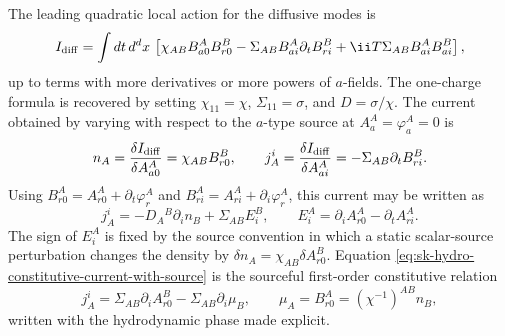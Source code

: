 The leading quadratic local action for the diffusive modes is
\begin{equation}
  I_{\rm diff}
  =
  \int dt\,d^dx\,
  \left[
  \chi_{AB}B^A_{a0}B^B_{r0}
  -\Sigma_{AB}B^A_{ai}\partial_t B^B_{ri}
  +\ii T\Sigma_{AB}B^A_{ai}B^B_{ai}
  \right],
  \label{eq:sk-hydro-diffusion-action}
\end{equation}
up to terms with more derivatives or more powers of \(a\)-fields.  The
one-charge formula is recovered by setting
\(\chi_{11}=\chi\), \(\Sigma_{11}=\sigma\), and \(D=\sigma/\chi\).  The
current obtained by varying with respect to the \(a\)-type source at
\(A^A_a=\varphi^A_a=0\) is
\begin{equation}
  n_A=\frac{\delta I_{\rm diff}}{\delta A^A_{a0}}
  =\chi_{AB}B^B_{r0},
  \qquad
  j_A^i=\frac{\delta I_{\rm diff}}{\delta A^A_{ai}}
  =-\Sigma_{AB}\partial_t B^B_{ri}.
  \label{eq:sk-hydro-density-current-from-action}
\end{equation}
Using \(B^A_{r0}=A^A_{r0}+\partial_t\varphi^A_r\) and
\(B^A_{ri}=A^A_{ri}+\partial_i\varphi^A_r\), this current may be written as
\begin{equation}
  j_A^i
  =
  -D_A{}^B\partial_i n_B+\Sigma_{AB}E^B_i,
  \qquad
  E^A_i=\partial_i A^A_{r0}-\partial_t A^A_{ri}.
  \label{eq:sk-hydro-constitutive-current-with-source}
\end{equation}
The sign of \(E^A_i\) is fixed by the source convention in which a static
scalar-source perturbation changes the density by
\(\delta n_A=\chi_{AB}\delta A^B_{r0}\).  Equation
\eqref{eq:sk-hydro-constitutive-current-with-source} is the sourceful
first-order constitutive relation
\[
  j_A^i=\Sigma_{AB}\partial_i A^B_{r0}
  -\Sigma_{AB}\partial_i\mu_B,
  \qquad
  \mu_A=B^A_{r0}=(\chi^{-1})^{AB}n_B ,
\]
written with the hydrodynamic phase made explicit.

